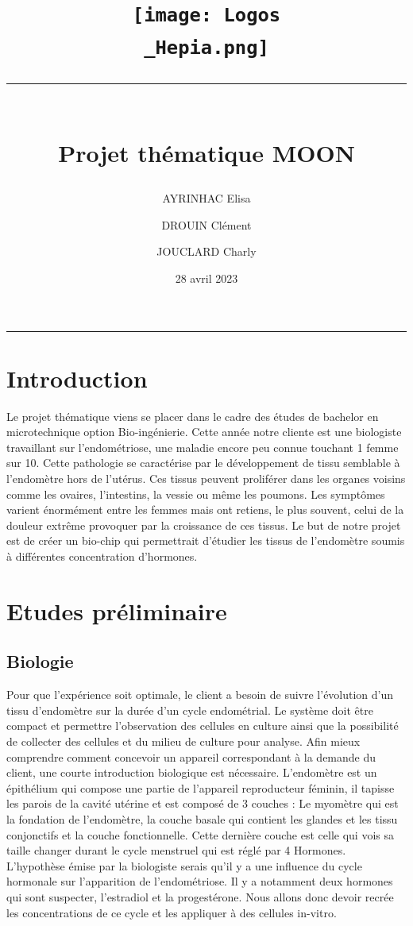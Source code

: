 \documentclass[a4paper, 11pt]{article}
\title{
    \vspace{-2.5cm}
    \centering\texttt{[image: Logos\\\_Hepia.png]}\\
    \centering\rule{17cm}{0.1mm}\vspace*{0.4in}\\
    \centering Projet thématique MOON}
\author[1]{AYRINHAC Elisa}
\author[2]{DROUIN Clément}
\author[3]{JOUCLARD Charly}
\affil[1]{HEPIA, MT2, elisa.ayrinhac@hes-so.ch}
\affil[2]{HEPIA, MT2, clement.drouin@hes-so.ch}
\affil[3]{HEPIA, MT2, charly.jouclard@hes-so.ch}
\date{28 avril 2023}
\begin{document}
\maketitle
\thispagestyle{empty}
\begin{center}
    \rule{\textwidth}{0.1mm}
\end{center}
\vspace{-1cm}
\section*{Introduction}
Le projet thématique viens se placer dans le cadre des études de bachelor en microtechnique option Bio-ingénierie.
Cette année notre cliente est une biologiste travaillant sur l'endométriose, une maladie encore peu connue touchant 1 femme sur 10.
Cette pathologie se caractérise par le développement de tissu semblable à l'endomètre hors de l'utérus.
Ces tissus peuvent proliférer dans les organes voisins comme les ovaires, l'intestins, la vessie ou même les poumons.
Les symptômes varient énormément entre les femmes mais ont retiens, le plus souvent, celui de la douleur extrême provoquer par la croissance de ces tissus.
Le but de notre projet est de créer un bio-chip qui permettrait d'étudier les tissus de l'endomètre soumis à différentes concentration d'hormones.
\newpage
\tableofcontents
\newpage
\section{Etudes préliminaire}
\subsection{Biologie}
Pour que l'expérience soit optimale, le client a besoin de suivre l'évolution d'un tissu d'endomètre sur la durée d'un cycle endométrial.
Le système doit être compact et permettre l'observation des cellules en culture ainsi que la possibilité de collecter des cellules et du milieu de culture pour analyse.
Afin mieux comprendre comment concevoir un appareil correspondant à la demande du client, une courte introduction biologique est nécessaire.
L'endomètre est un épithélium qui compose une partie de l'appareil reproducteur féminin, il tapisse les parois de la cavité utérine et est composé de 3 couches :
Le myomètre qui est la fondation de l'endomètre, la couche basale qui contient les glandes et les tissu conjonctifs et la couche fonctionnelle.
Cette dernière couche est celle qui vois sa taille changer durant le cycle menstruel qui est réglé par 4 Hormones.
L'hypothèse émise par la biologiste serais qu'il y a une influence du cycle hormonale sur l'apparition de l'endométriose.
Il y a notamment deux hormones qui sont suspecter, l'estradiol et la progestérone.
Nous allons donc devoir recrée les concentrations de ce cycle et les appliquer à des cellules in-vitro.
\end{document}
